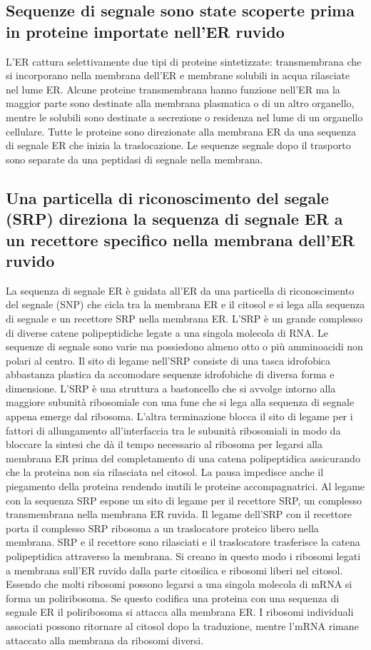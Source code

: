 \subsection{Sequenze di segnale sono state scoperte prima in proteine importate nell'ER ruvido}
L'ER cattura selettivamente due tipi di proteine sintetizzate: transmembrana che si incorporano nella membrana dell'ER e membrane solubili in acqua rilasciate nel lume ER. Alcune 
proteine transmembrana hanno funzione nell'ER ma la maggior parte sono destinate alla membrana plasmatica o di un altro organello, mentre le solubili sono destinate a secrezione o 
residenza nel lume di un organello cellulare. Tutte le proteine sono direzionate alla membrana ER da una sequenza di segnale ER che inizia la traslocazione. Le sequenze segnale
dopo il trasporto sono separate da una peptidasi di segnale nella membrana. 
\subsection{Una particella di riconoscimento del segale (SRP) direziona la sequenza di segnale ER a un recettore specifico nella membrana dell'ER ruvido}
La sequenza di segnale ER \`e guidata all'ER da una particella di riconoscimento del segnale (SNP) che cicla tra la membrana ER e il citosol e si lega alla sequenza di segnale e un 
recettore SRP nella membrana ER. L'SRP \`e un grande complesso di diverse catene polipeptidiche legate a una singola molecola di RNA. Le sequenze di segnale sono varie ma possiedono 
almeno otto o pi\`u amminoacidi non polari al centro. Il sito di legame nell'SRP consiste di una tasca idrofobica abbastanza plastica da accomodare sequenze idrofobiche di diversa
forma e dimensione. L'SRP \`e una struttura a bastoncello che si avvolge intorno alla maggiore subunit\`a ribosomiale con una fune che si lega alla sequenza di segnale appena emerge 
dal ribosoma. L'altra terminazione blocca il sito di legame per i fattori di allungamento all'interfaccia tra le subunit\`a ribosomiali in modo da bloccare la sintesi che
d\`a il tempo necessario al ribosoma per legarsi alla membrana ER prima del completamento di una catena polipeptidica assicurando che la proteina non sia rilasciata nel citosol. La pausa
impedisce anche il piegamento della proteina rendendo inutili le proteine accompagnatrici. Al legame con la sequenza SRP espone un sito di legame per il recettore SRP, un complesso
transmembrana nella membrana ER ruvida. Il legame dell'SRP con il recettore porta il complesso SRP ribosoma a un traslocatore proteico libero nella membrana. SRP e il recettore sono
rilasciati e il traslocatore trasferisce la catena polipeptidica attraverso la membrana. Si creano in questo modo i ribosomi legati a membrana sull'ER ruvido dalla parte citosilica e
ribosomi liberi nel citosol. Essendo che molti ribosomi possono legarsi a una singola molecola di mRNA si forma un poliribosoma. Se questo codifica una proteina con una sequenza di 
segnale ER il poliribosoma si attacca alla membrana ER. I ribosomi individuali associati possono ritornare al citosol dopo la traduzione, mentre l'mRNA rimane attaccato alla membrana
da ribosomi diversi.
